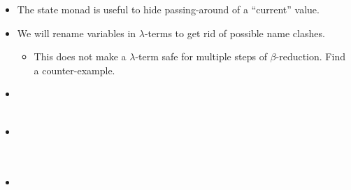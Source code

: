 \documentclass{beamer}
\begin{document}
{}
\begin{itemize}
  \item The state monad is useful to hide passing-around of a ``current''
  value.
  
  \item We will rename variables in $\lambda$-terms to get rid of possible
  name clashes.
  \begin{itemize}
    \item This does not make a $\lambda$-term safe for multiple steps of
    $\beta$-reduction. Find a counter-example.
  \end{itemize}
  \item {}{}{\hlopt{=}}{\hlendline{}}\\
  {\hlopt{\textbar }}{}{}{}{\hlendline{}}\\
  {\hlopt{\textbar }}{}{}{}{\hlopt{*
  }}{}{}{}{}{\hlopt{*
  }}{}{\hlendline{}}
  
  \item {}{\hlopt{(!) }}{}{\hlopt{= }}{}{}{\hlendline{}}\\
  {}{\hlopt{(}}{\hlstd{{\hlopt{\textbar}}}}{\hlopt{->) }}{}{\hlopt{= }}{}{\hlopt{(}}{}{\hlopt{,
  }}{}{\hlopt{)}}{\hlendline{}}\\
  {}{\hlopt{(}}{}{\hlopt{) }}{}{\hlopt{=
  }}{}{\hlopt{(}}{}{\hlopt{,
  }}{}{\hlopt{)}}{\hlendline{}}\\
  {}{}{\hlopt{= }}{}{\hlstd{
  {\hlopt{\textbar}}}}{\hlopt{-> (}}{}{\hlstd{
  {\hlopt{\textbar}}}}{\hlopt{-> !}}{}{}{\hlopt{!}}{}{\hlopt{) }}{}{\hlopt{!}}{}{\hlendline{}}
  
  \item {}{}{\hlopt{=}}{\hlendline{}}\\
  {\hlstd{ \ }}{}{\hlopt{(}}{}{}{\hlopt{= }}{}{\hlopt{* (}}{}{\hlopt{*
  }}{}{\hlopt{) }}{}{}{\hlopt{)}}\\
  {}{}
  

\end{itemize}
\end{document}
